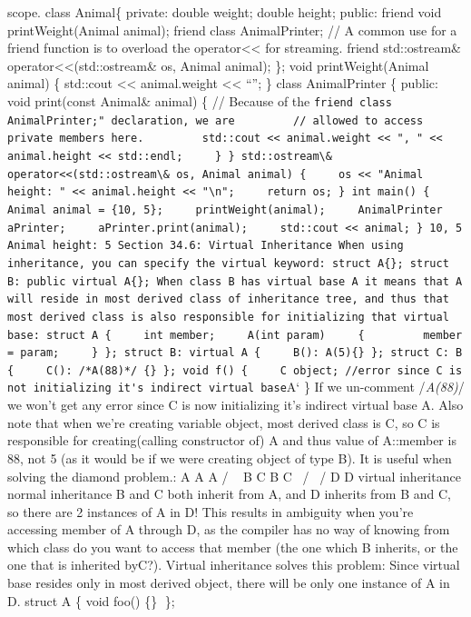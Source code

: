 scope. class Animal\{ private: double weight; double height; public:
friend void printWeight(Animal animal); friend class AnimalPrinter; // A
common use for a friend function is to overload the
operator\textless\textless{} for streaming. friend std::ostream\&
operator\textless\textless(std::ostream\& os, Animal animal); \}; void
printWeight(Animal animal) \{ std::cout \textless\textless{}
animal.weight \textless\textless{} ``\n''; \} class AnimalPrinter \{
public: void print(const Animal\& animal) \{ // Because of the
\passthrough{\lstinline!friend class AnimalPrinter;" declaration, we are         // allowed to access private members here.         std::cout << animal.weight << ", " << animal.height << std::endl;     \} \} std::ostream\& operator<<(std::ostream\& os, Animal animal) \{     os << "Animal height: " << animal.height << "\\n";     return os; \} int main() \{     Animal animal = \{10, 5\};     printWeight(animal);     AnimalPrinter aPrinter;     aPrinter.print(animal);     std::cout << animal; \} 10, 5 Animal height: 5 Section 34.6: Virtual Inheritance When using inheritance, you can specify the virtual keyword: struct A\{\}; struct B: public virtual A\{\}; When class B has virtual base A it means that A will reside in most derived class of inheritance tree, and thus that most derived class is also responsible for initializing that virtual base: struct A \{     int member;     A(int param)     \{         member = param;     \} \}; struct B: virtual A \{     B(): A(5)\{\} \}; struct C: B \{     C(): /*A(88)*/ \{\} \}; void f() \{     C object; //error since C is not initializing it's indirect virtual base!}A`
\} If we un-comment /\emph{A(88)}/ we won't get any error since C is now
initializing it's indirect virtual base A. Also note that when we're
creating variable object, most derived class is C, so C is responsible
for creating(calling constructor of) A and thus value of A::member is
88, not 5 (as it would be if we were creating object of type B). It is
useful when solving the diamond problem.: A A A / ~ \textbar{}
\textbar{} B C B C ~/ ~/ D D virtual inheritance normal inheritance B
and C both inherit from A, and D inherits from B and C, so there are 2
instances of A in D! This results in ambiguity when you're accessing
member of A through D, as the compiler has no way of knowing from which
class do you want to access that member (the one which B inherits, or
the one that is inherited byC?). Virtual inheritance solves this
problem: Since virtual base resides only in most derived object, there
will be only one instance of A in D. struct A \{ void foo() \{\} \};

